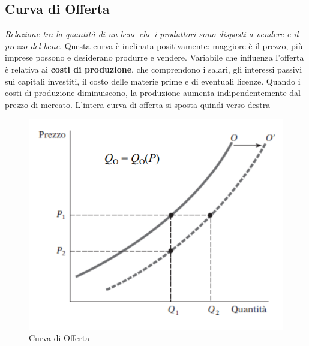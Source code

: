 \documentclass[12pt]{article}
\begin{document}
\subsection{Curva di Offerta}
\textit{Relazione tra la quantità di un bene che i produttori sono disposti a vendere e il prezzo del bene}. Questa curva è inclinata positivamente: maggiore è il prezzo, più imprese possono e desiderano produrre e vendere. Variabile che influenza l'offerta è relativa ai \textbf{costi di produzione}, che comprendono i salari, gli interessi passivi sui capitali investiti, il costo delle materie prime e di eventuali licenze. Quando i costi di produzione diminuiscono, la produzione aumenta indipendentemente dal prezzo di mercato. L’intera curva di offerta si sposta quindi verso destra
\FloatBarrier
\begin{figure}[!htb]
    \centering
    \includegraphics[width=1\textwidth]{images/offerta.png}
    \caption{Curva di Offerta}
\end{figure}
\end{document}
